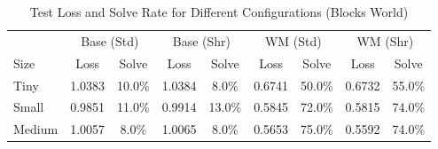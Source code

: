 \begin{table}[t]
\centering
\caption{Test Loss and Solve Rate for Different Configurations (Blocks World)}
\begin{tabular}{l|cc|cc|cc|cc}
\hline
& \multicolumn{2}{c|}{Base (Std)} & \multicolumn{2}{c|}{Base (Shr)} & \multicolumn{2}{c|}{WM (Std)} & \multicolumn{2}{c}{WM (Shr)} \\
Size & Loss & Solve & Loss & Solve & Loss & Solve & Loss & Solve \\
\hline
Tiny & 1.0383 & 10.0\% & 1.0384 & 8.0\% & 0.6741 & 50.0\% & 0.6732 & 55.0\% \\
Small & 0.9851 & 11.0\% & 0.9914 & 13.0\% & 0.5845 & 72.0\% & 0.5815 & 74.0\% \\
Medium & 1.0057 & 8.0\% & 1.0065 & 8.0\% & 0.5653 & 75.0\% & 0.5592 & 74.0\% \\
\hline
\end{tabular}
\end{table}
